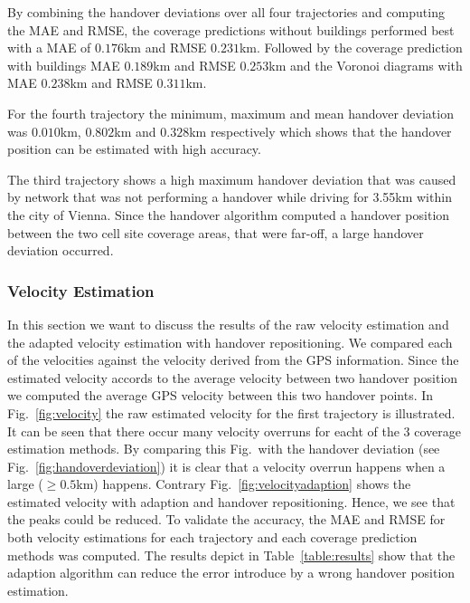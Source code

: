 By combining the handover deviations over all four trajectories and computing the MAE and RMSE, the coverage predictions without buildings performed best with a MAE of $0.176$km and RMSE $0.231$km. Followed by the coverage prediction with buildings MAE $0.189$km and RMSE $0.253$km and the Voronoi diagrams with MAE $0.238$km and RMSE $0.311$km.

For the fourth trajectory the minimum, maximum and mean handover deviation was $0.010$km, $0.802$km and $0.328$km respectively which shows that the handover position can be estimated with high accuracy.

The third trajectory shows a high maximum handover deviation that was caused by network that was not performing a handover while driving for 3.55km within the city of Vienna. Since the handover algorithm computed a handover position between the two cell site coverage areas, that were far-off, a large handover deviation occurred.
\subsubsection{Velocity Estimation}
In this section we want to discuss the results of the raw velocity estimation and the adapted velocity estimation with handover repositioning. We compared each of the velocities against the velocity derived from the GPS information. Since the estimated velocity accords to the average velocity between two handover position we computed the average GPS velocity between this two handover points. In Fig.~\ref{fig:velocity} the raw estimated velocity for the first trajectory is illustrated. It can be seen that there occur many velocity overruns for eacht of the 3 coverage estimation methods. By comparing this Fig.\ with the handover deviation (see Fig.~\ref{fig:handoverdeviation}) it is clear that a velocity overrun happens when a large ($\ge0.5$km) happens. Contrary Fig.~\ref{fig:velocityadaption} shows the estimated velocity with adaption and handover repositioning. Hence, we see that the peaks could be reduced. To validate the accuracy, the MAE and RMSE for both velocity estimations for each trajectory and each coverage prediction methods was computed. The results depict in Table~\ref{table:results} show that the adaption algorithm can reduce the error introduce by a wrong handover position estimation.

